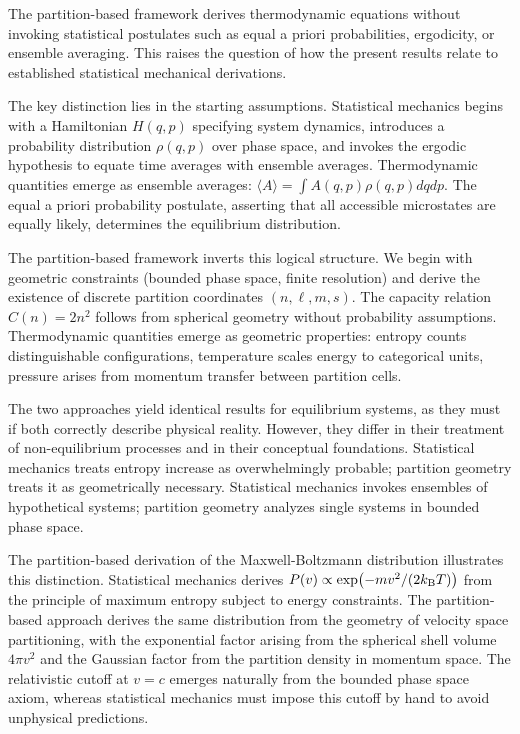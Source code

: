 The partition-based framework derives thermodynamic equations without invoking statistical postulates such as equal a priori probabilities, ergodicity, or ensemble averaging. This raises the question of how the present results relate to established statistical mechanical derivations.

The key distinction lies in the starting assumptions. Statistical mechanics begins with a Hamiltonian $H(q,p)$ specifying system dynamics, introduces a probability distribution $\rho(q,p)$ over phase space, and invokes the ergodic hypothesis to equate time averages with ensemble averages. Thermodynamic quantities emerge as ensemble averages: $\langle A \rangle = \int A(q,p) \rho(q,p) dq dp$. The equal a priori probability postulate, asserting that all accessible microstates are equally likely, determines the equilibrium distribution.

The partition-based framework inverts this logical structure. We begin with geometric constraints (bounded phase space, finite resolution) and derive the existence of discrete partition coordinates $(n,\ell,m,s)$. The capacity relation $C(n) = 2n^2$ follows from spherical geometry without probability assumptions. Thermodynamic quantities emerge as geometric properties: entropy counts distinguishable configurations, temperature scales energy to categorical units, pressure arises from momentum transfer between partition cells.

The two approaches yield identical results for equilibrium systems, as they must if both correctly describe physical reality. However, they differ in their treatment of non-equilibrium processes and in their conceptual foundations. Statistical mechanics treats entropy increase as overwhelmingly probable; partition geometry treats it as geometrically necessary. Statistical mechanics invokes ensembles of hypothetical systems; partition geometry analyzes single systems in bounded phase space.

The partition-based derivation of the Maxwell-Boltzmann distribution illustrates this distinction. Statistical mechanics derives $P(v) \propto \exp(-mv^2/(2k_{\mathrm{B}} T))$ from the principle of maximum entropy subject to energy constraints. The partition-based approach derives the same distribution from the geometry of velocity space partitioning, with the exponential factor arising from the spherical shell volume $4\pi v^2$ and the Gaussian factor from the partition density in momentum space. The relativistic cutoff at $v = c$ emerges naturally from the bounded phase space axiom, whereas statistical mechanics must impose this cutoff by hand to avoid unphysical predictions.

